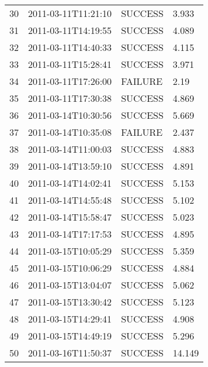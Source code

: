 \begin{tabularx}{\textwidth}{p{1cm} p{3cm} p{2cm} X}
 30 & 2011-03-11T11:21:10 & SUCCESS & 3.933 \\
 31 & 2011-03-11T14:19:55 & SUCCESS & 4.089 \\
 32 & 2011-03-11T14:40:33 & SUCCESS & 4.115 \\
 33 & 2011-03-11T15:28:41 & SUCCESS & 3.971 \\
 34 & 2011-03-11T17:26:00 & FAILURE & 2.19 \\
 35 & 2011-03-11T17:30:38 & SUCCESS & 4.869 \\
 36 & 2011-03-14T10:30:56 & SUCCESS & 5.669 \\
 37 & 2011-03-14T10:35:08 & FAILURE & 2.437 \\
 38 & 2011-03-14T11:00:03 & SUCCESS & 4.883 \\
 39 & 2011-03-14T13:59:10 & SUCCESS & 4.891 \\
 40 & 2011-03-14T14:02:41 & SUCCESS & 5.153 \\
 41 & 2011-03-14T14:55:48 & SUCCESS & 5.102 \\
 42 & 2011-03-14T15:58:47 & SUCCESS & 5.023 \\
 43 & 2011-03-14T17:17:53 & SUCCESS & 4.895 \\
 44 & 2011-03-15T10:05:29 & SUCCESS & 5.359 \\
 45 & 2011-03-15T10:06:29 & SUCCESS & 4.884 \\
 46 & 2011-03-15T13:04:07 & SUCCESS & 5.062 \\
 47 & 2011-03-15T13:30:42 & SUCCESS & 5.123 \\
 48 & 2011-03-15T14:29:41 & SUCCESS & 4.908 \\
 49 & 2011-03-15T14:49:19 & SUCCESS & 5.296 \\
 50 & 2011-03-16T11:50:37 & SUCCESS & 14.149 \\
 \bottomrule
\end{tabularx}
\newpage
